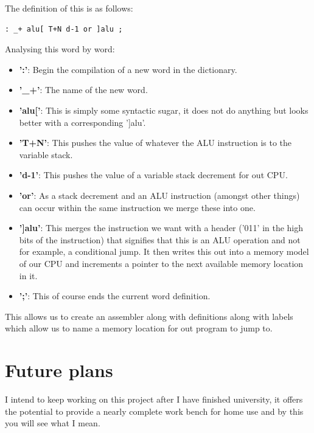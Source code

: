 \documentclass	[a4paper, 10pt]	{article}
\begin{document}
    The definition of this is as follows:    

\begin{verbatim}
: _+ alu[ T+N d-1 or ]alu ;
\end{verbatim}

    Analysing this word by word:

    \begin{itemize}
      \item \textbf{':'}: Begin the compilation of a new word in the dictionary.
      \item \textbf{'\_+'}: The name of the new word.
      \item \textbf{'alu['}: This is simply some syntactic sugar, it does not
      do anything but looks better with a corresponding ']alu'.
      \item \textbf{'T+N'}: This pushes the value of whatever the ALU instruction
      is to the variable stack.
      \item \textbf{'d-1'}: This pushes the value of a variable stack decrement
      for out CPU.
      \item \textbf{'or'}: As a stack decrement and an ALU instruction (amongst
      other things) can occur within the same instruction we merge these into
      one.
      \item \textbf{']alu'}: This merges the instruction we want with a header
      ('011' in the high bits of the instruction) that signifies that this is
      an ALU operation and not for example, a conditional jump. It then writes
      this out into a memory model of our CPU and increments a pointer to the
      next available memory location in it.
      \item \textbf{';'}: This of course ends the current word definition.
    \end{itemize}

    This allows us to create an assembler along with definitions along with labels
    which allow us to name a memory location for out program to jump to.

   \section{Future plans}
    \label{sec:futurePlans}

    I intend to keep working on this project after I have finished university, it offers the
    potential to provide a nearly complete work bench for home use and by this you will see
    what I mean.
\end{document}
